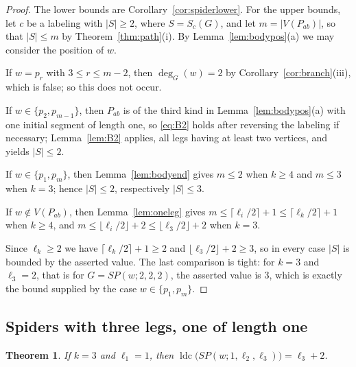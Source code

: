 \documentclass[reqno,10pt]{article}
\newtheorem{theorem}{Theorem}
\theoremstyle{definition}
\numberwithin{equation}{section}
\numberwithin{theorem}{section}
\newcommand{\ldc}{\operatorname{ldc}}
\begin{document}
\begin{proof}
The lower bounds are Corollary~\ref{cor:spiderlower}. For the upper bounds, let
$c$ be a labeling with $|S|\ge2$, where $S=S_c(G)$, and let $m=|V(P_{ab})|$, so
that $|S|\le m$ by Theorem~\ref{thm:path}(i). By
Lemma~\ref{lem:bodypos}(a) we may consider the position of $w$.

If $w=p_r$ with $3\le r\le m-2$, then $\deg_G(w)=2$ by
Corollary~\ref{cor:branch}(iii), which is false; so this does not occur.

If $w\in\{p_2,p_{m-1}\}$, then $P_{ab}$ is of the third kind in
Lemma~\ref{lem:bodypos}(a) with one initial segment of length one, so
\eqref{eq:B2} holds after reversing the labeling if necessary;
Lemma~\ref{lem:B2} applies, all legs having at least two vertices, and yields
$|S|\le2$.

If $w\in\{p_1,p_m\}$, then Lemma~\ref{lem:bodyend} gives $m\le2$ when $k\ge4$
and $m\le3$ when $k=3$; hence $|S|\le2$, respectively $|S|\le3$.

If $w\notin V(P_{ab})$, then Lemma~\ref{lem:oneleg} gives
$m\le\lceil \ell_i/2\rceil+1\le\lceil \ell_k/2\rceil+1$ when $k\ge4$, and
$m\le\lfloor \ell_i/2\rfloor+2\le\lfloor \ell_3/2\rfloor+2$ when $k=3$.

Since $\ell_k\ge2$ we have $\lceil \ell_k/2\rceil+1\ge2$ and
$\lfloor \ell_3/2\rfloor+2\ge3$, so in every case $|S|$ is bounded by the
asserted value. The last comparison is tight: for $k=3$ and $\ell_3=2$, that is
for $G=SP(w;2,2,2)$, the asserted value is $3$, which is exactly the bound
supplied by the case $w\in\{p_1,p_m\}$.
\end{proof}

\subsection{Spiders with three legs, one of length one}
\label{sec:sp3short}

\begin{theorem}
\label{thm:spider3short}
If $k=3$ and $\ell_1=1$, then $\ldc\bigl(SP(w;1,\ell_2,\ell_3)\bigr)=\ell_3+2$.
\end{theorem}
\end{document}
